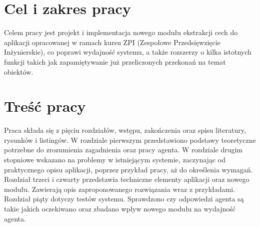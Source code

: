 \section*{Cel i zakres pracy}

Celem pracy jest projekt i implementacja nowego modułu ekstrakcji cech do aplikacji opracowanej w ramach kursu ZPI (Zespołowe Przedsięwzięcie Inżynierskie), co poprawi wydajność systemu, a także rozszerzy o kilka istotnych funkcji takich jak zapamiętywanie już przeliczonych przekonań na temat obiektów. 


\section*{Treść pracy}

Praca składa się z pięciu rozdziałów, wstępu, zakończenia oraz spisu literatury, rysunków i listingów. 
W rozdziale pierwszym przedstawiono podstawy teoretyczne potrzebne do zrozumienia zagadnienia oraz pracy agenta.
W rozdziale drugim stopniowe wskazano na problemy w istniejącym systemie, zaczynając od praktycznego opisu aplikacji, poprzez przykład pracy, aż do określenia wymagań.
Rozdział trzeci i czwarty przedstawia techniczne elementy aplikacji oraz nowego modułu. Zawierają opis zaproponowanego rozwiązania wraz z przykładami.
Rozdział piąty dotyczy testów systemu. Sprawdzono czy odpowiedzi agenta są takie jakich oczekiwano oraz zbadano wpływ nowego modułu na wydajność agenta.